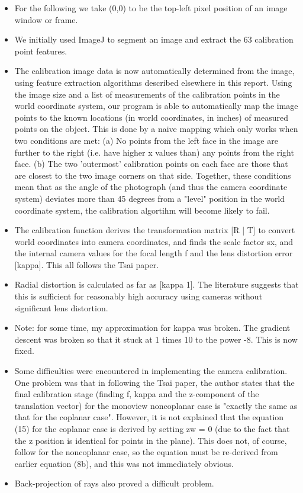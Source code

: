 \begin{itemize}
  \item For the following we take (0,0) to be the top-left pixel position of an image window or frame.
  \item We initially used ImageJ to segment an image and extract the 63 calibration point features.
  \item The calibration image data is now automatically determined from the image, using feature extraction algorithms described elsewhere in this report. Using the image size and a list of measurements of the calibration points in the world coordinate system, our program is able to automatically map the image points to the known locations (in world coordinates, in inches) of measured points on the object. This is done by a naive mapping which only works when two conditions are met: (a) No points from the left face in the image are further to the right (i.e. have higher x values than) any points from the right face. (b) The two 'outermost' calibration points on each face are those that are closest to the two image corners on that side. Together, these conditions mean that as the angle of the photograph (and thus the camera coordinate system) deviates more than 45 degrees from a "level" position in the world coordinate system, the calibration algortihm will become likely to fail.
  \item The calibration function derives the transformation matrix [R | T] to convert world coordinates into camera coordinates, and finds the scale factor sx, and the internal camera values for the focal length f and the lens distortion error [kappa]. This all follows the Tsai paper.
  \item Radial distortion is calculated as far as [kappa 1]. The literature suggests that this is sufficient for reasonably high accuracy using cameras without significant lens distortion.
  \item Note: for some time, my approximation for kappa was broken. The gradient descent was broken so that it stuck at 1 times 10 to the power -8. This is now fixed.
  \item Some difficulties were encountered in implementing the camera calibration. One problem was that in following the Tsai paper, the author states that the final calibration stage (finding f, kappa and the z-component of the translation vector) for the monoview noncoplanar case is "exactly the same as that for the coplanar case". However, it is not explained that the equation (15) for the coplanar case is derived by setting zw = 0 (due to the fact that the z position is identical for points in the plane). This does not, of course, follow for the noncoplanar case, so the equation must be re-derived from earlier equation (8b), and this was not immediately obvious.
  \item Back-projection of rays also proved a difficult problem.
\end{itemize}
